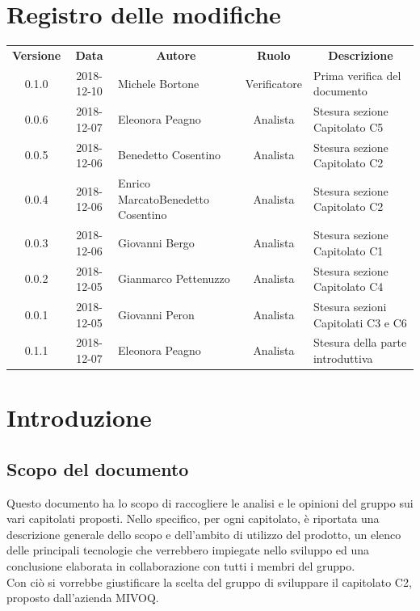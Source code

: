 \documentclass[11pt,a4paper]{article}
\begin{document}
	
	
	\newpage
	\section*{\centering Registro delle modifiche}
	\begin{tabularx}{\textwidth}{ c | c | X | c | X }
		\rowcolor{LightBlue}
		\color{white}\bfseries Versione & \color{white}\bfseries Data & \multicolumn{1}{c}{\color{white}\bfseries Autore} & \color{white}\bfseries Ruolo & \multicolumn{1}{c}{\color{white}\bfseries Descrizione}\\[0.25cm]
		
		0.1.0 & 2018-12-10 & Michele Bortone & Verificatore & Prima verifica del documento\\ \hline
		0.0.6 & 2018-12-07 & Eleonora Peagno & Analista & Stesura sezione Capitolato C5\\ \hline
		0.0.5 & 2018-12-06 & Benedetto Cosentino & Analista & Stesura sezione Capitolato C2\\ \hline
		0.0.4 & 2018-12-06 & Enrico Marcato\newline Benedetto Cosentino & Analista & Stesura sezione Capitolato C2\\ \hline
		0.0.3 & 2018-12-06 & Giovanni Bergo & Analista & Stesura sezione Capitolato C1\\ \hline
		0.0.2 & 2018-12-05 & Gianmarco Pettenuzzo & Analista & Stesura sezione Capitolato C4\\ \hline
		0.0.1 & 2018-12-05 & Giovanni Peron & Analista & Stesura sezioni Capitolati C3 e C6\\ \hline
		
		
		0.1.1 & 2018-12-07 & Eleonora Peagno & Analista & Stesura della parte introduttiva\\ \hline
		
	\end{tabularx}
	\newpage
	\tableofcontents
	\newpage
	\section{Introduzione}
	\subsection{Scopo del documento}
	Questo documento ha lo scopo di raccogliere le analisi e le opinioni del gruppo sui vari capitolati proposti. Nello specifico, per ogni capitolato, è riportata una descrizione generale dello scopo e dell'ambito di utilizzo del prodotto, un elenco delle principali tecnologie che verrebbero impiegate nello sviluppo ed una conclusione elaborata in collaborazione con tutti i membri del gruppo.\\
Con ciò si vorrebbe giustificare la scelta del gruppo di sviluppare il capitolato C2, proposto dall'azienda MIVOQ.
\end{document}
